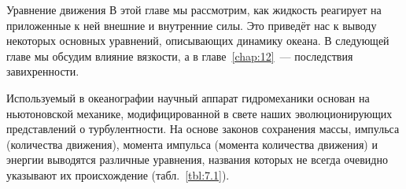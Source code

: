 
\begin{chapter}{Уравнение движения}\label{chap:7}
В этой главе мы рассмотрим, как жидкость реагирует на приложенные к ней 
внешние и внутренние силы. Это приведёт нас к выводу некоторых основных 
уравнений, описывающих динамику океана. В следующей главе мы обсудим влияние 
вязкости, а в главе~\ref{chap:12}~--- последствия завихренности.
%

Используемый в океанографии научный аппарат гидромеханики основан на 
ньютоновской механике, модифицированной в свете наших эволюционирующих
представлений о турбулентности. На основе законов сохранения массы, импульса 
(количества движения), момента импульса (момента количества движения) 
и энергии выводятся различные уравнения, названия которых не всегда очевидно
указывают их происхождение (табл.~\ref{tbl:7.1}).  
%


\end{chapter}
